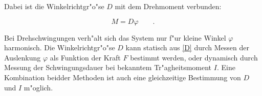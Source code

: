 	Dabei ist die Winkelrichtgr"o"se $D$ mit dem Drehmoment verbunden:

	\begin{equation}
		M = D \varphi \qquad . \label{D}
	\end{equation}

	Bei Drehschwingungen verh"alt sich das System nur f"ur kleine Winkel $\varphi$ harmonisch.
	Die Winkelrichtgr"o"se $D$ kann statisch aus \eqref{D} durch Messen der Auslenkung $\varphi$ als Funktion der Kraft $F$ bestimmt werden, oder dynamisch durch Messung der Schwingungsdauer bei bekanntem Tr"agheitsmoment $I$.
	Eine Kombination beidder Methoden ist auch eine gleichzeitige Bestimmung von $D$ und $I$ m"oglich.
